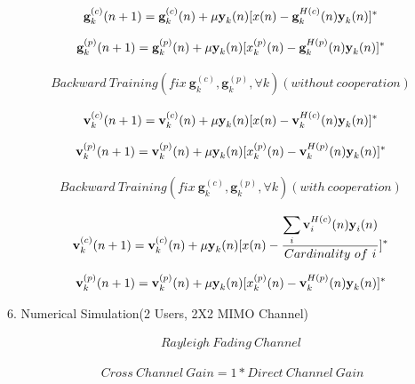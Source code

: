 \documentclass[11pt, oneside]{article}   	%
\begin{document}
\begin{align*}
\textbf{g}^{(c)}_{k}(n+1)= \textbf{g}^{(c)}_{k}(n)+ \mu \textbf y_k(n) [x(n)- \textbf{g}^{H(c)}_{k}(n) \textbf y_k(n)]^*
\end{align*}

\begin{align*}
\textbf{g}^{(p)}_{k}(n+1)= \textbf{g}^{(p)}_{k}(n)+ \mu \textbf y_k(n) [x_k^{(p)}(n)- \textbf{g}^{H(p)}_{k}(n) \textbf y_k(n)]^*
\end{align*}

\begin{align*}
Backward\ Training (fix\  \textbf{g}^{(c)}_{k}, \textbf{g}^{(p)}_{k}, \forall k)(without\ cooperation)
\end{align*}

\begin{align*}
\textbf{v}^{(c)}_{k}(n+1)= \textbf{v}^{(c)}_{k}(n)+ \mu \textbf y_k(n) [x(n)- \textbf{v}^{H(c)}_{k}(n) \textbf y_k(n)]^*
\end{align*}

\begin{align*}
\textbf{v}^{(p)}_{k}(n+1)= \textbf{v}^{(p)}_{k}(n)+ \mu \textbf y_k(n) [x_k^{(p)}(n)- \textbf{v}^{H(p)}_{k}(n) \textbf y_k(n)]^*
\end{align*}

\begin{align*}
Backward\ Training (fix\  \textbf{g}^{(c)}_{k}, \textbf{g}^{(p)}_{k}, \forall k)(with\ cooperation)
\end{align*}

\begin{align*}
\textbf{v}^{(c)}_{k}(n+1)= \textbf{v}^{(c)}_{k}(n)+ \mu \textbf y_k(n) [x(n)- \frac {\displaystyle\sum_{i}\textbf{v}^{H(c)}_{i}(n) \textbf y_i(n)}	{Cardinality\ of \ i}]^*
\end{align*}

\begin{align*}
\textbf{v}^{(p)}_{k}(n+1)= \textbf{v}^{(p)}_{k}(n)+ \mu \textbf y_k(n) [x_k^{(p)}(n)- \textbf{v}^{H(p)}_{k}(n) \textbf y_k(n)]^*
\end{align*}

6. Numerical Simulation(2 Users, 2X2 MIMO Channel)


\begin{align*}
Rayleigh\ Fading\ Channel
\end{align*}

\begin{align*}
\ Cross\ Channel\ Gain = 1*Direct\ Channel\ Gain
\end{align*}
\end{document}

